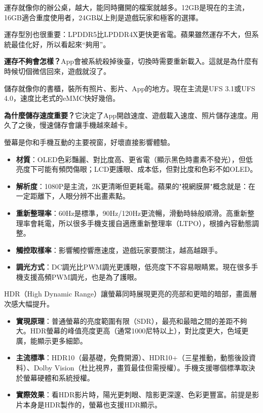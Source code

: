 
運存就像你的辦公桌，越大，能同時攤開的檔案就越多。12GB是現在的主流，16GB適合重度使用者，24GB以上則是遊戲玩家和極客的選擇。

運存型別也很重要：LPDDR5比LPDDR4X更快更省電。蘋果雖然運存不大，但系統最佳化好，所以看起來“夠用”。

\textbf{運存不夠會怎樣？}App會被系統殺掉後臺，切換時需要重新載入。這就是為什麼有時候切個微信回來，遊戲就沒了。


儲存就像你的書櫃，裝所有照片、影片、App的地方。現在主流是UFS 3.1或UFS 4.0，速度比老式的eMMC快好幾倍。

\textbf{為什麼儲存速度重要？}它決定了App開啟速度、遊戲載入速度、照片儲存速度。用久了之後，慢速儲存會讓手機越來越卡。


螢幕是你和手機互動的主要視窗，好壞直接影響體驗。

\begin{itemize}
  \item \textbf{材質}：OLED色彩豔麗、對比度高、更省電（顯示黑色時畫素不發光），但低亮度下可能有頻閃傷眼；LCD更護眼、成本低，但對比度和色彩不如OLED。
  \item \textbf{解析度}：1080P是主流，2K更清晰但更耗電。蘋果的"視網膜屏"概念就是：在一定距離下，人眼分辨不出畫素點。
  \item \textbf{重新整理率}：60Hz是標準，90Hz/120Hz更流暢，滑動時絲般順滑。高重新整理率會耗電，所以很多手機支援自適應重新整理率（LTPO），根據內容動態調整。
  \item \textbf{觸控取樣率}：影響觸控響應速度，遊戲玩家要關注，越高越跟手。
  \item \textbf{調光方式}：DC調光比PWM調光更護眼，低亮度下不容易眼睛累。現在很多手機支援高頻PWM調光，也是為了護眼。
\end{itemize}


HDR（High Dynamic Range）讓螢幕同時展現更亮的亮部和更暗的暗部，畫面層次感大幅提升。

\begin{itemize}
  \item \textbf{實現原理}：普通螢幕的亮度範圍有限（SDR），最亮和最暗之間的差距不夠大。HDR螢幕的峰值亮度更高（通常1000尼特以上），對比度更大，色域更廣，能顯示更多細節。
  \item \textbf{主流標準}：HDR10（最基礎，免費開源）、HDR10+（三星推動，動態後設資料）、Dolby Vision（杜比視界，畫質最佳但需授權）。手機支援哪個標準取決於螢幕硬體和系統授權。
  \item \textbf{實際效果}：看HDR影片時，陽光更刺眼、陰影更深邃、色彩更豐富。前提是影片本身是HDR製作的，螢幕也支援HDR顯示。
\end{itemize}

